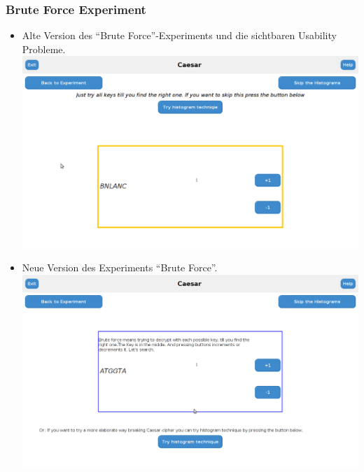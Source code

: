 \documentclass{article}
\begin{document}
	  \subsubsection{Brute Force Experiment}
	   \begin{itemize}
	    \item Alte Version des ``Brute Force''-Experiments und die sichtbaren Usability Probleme.\newline
	          \includegraphics[width=15cm]{resources/bruteForceUsability.png}
	    \newpage\item Neue Version des Experiments ``Brute Force''.\newline
	          \includegraphics[width=15cm]{resources/bruteForceFix.png}
	   \end{itemize}
\end{document}

